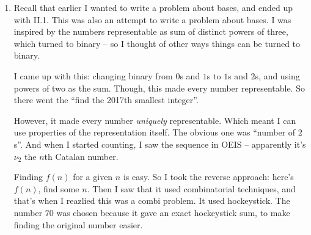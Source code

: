 \documentclass[10pt,paper=letter]{scrartcl}
\begin{document}
\begin{enumerate}
  \item Recall that earlier I wanted to write a problem about bases, and ended up with II.1. This was also an attempt to write a problem about bases. I was inspired by the numbers representable as sum of distinct powers of three, which turned to binary -- so I thought of other ways things can be turned to binary.

  I came up with this: changing binary from $0$s and $1$s to $1$s and $2$s, and using powers of two as the sum. Though, this made every number representable. So there went the ``find the 2017th smallest integer''.

  However, it made every number \emph{uniquely} representable. Which meant I can use properties of the representation itself. The obvious one was ``number of $2$s''. And when I started counting, I saw the sequence in OEIS -- apparently it's $\nu_2$ the $n$th Catalan number.

  Finding $f(n)$ for a given $n$ is easy. So I took the reverse approach: here's $f(n)$, find some $n$. Then I saw that it used combinatorial techniques, and that's when I reazlied this was a combi problem. It used hockeystick. The number $70$ was chosen because it gave an exact hockeystick sum, to make finding the original number easier.
\end{enumerate}
\end{document}
